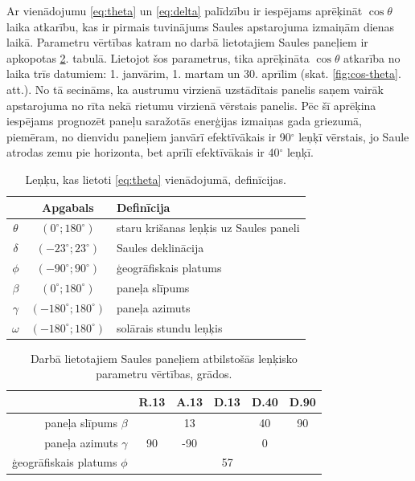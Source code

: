 Ar vienādojumu \ref{eq:theta} un \ref{eq:delta} palīdzību ir iespējams aprēķināt $\cos{\theta}$ laika atkarību, kas ir pirmais tuvinājums Saules apstarojuma izmaiņām dienas laikā.
Parametru vērtības katram no darbā lietotajiem Saules paneļiem ir apkopotas \ref{tab:param}. tabulā.
Lietojot šos parametrus, tika aprēķināta $\cos{\theta}$ atkarība no laika trīs datumiem: 1. janvārim, 1. martam un 30. aprīlim (skat. \ref{fig:cos-theta}. att.). No tā secināms, ka austrumu virzienā uzstādītais panelis saņem vairāk apstarojuma no rīta nekā rietumu virzienā vērstais panelis. Pēc šī aprēķina iespējams prognozēt paneļu saražotās enerģijas izmaiņas gada griezumā, piemēram, no dienvidu paneļiem janvārī efektīvākais ir 90$^\circ$ leņķī vērstais, jo Saule atrodas zemu pie horizonta, bet aprīlī efektīvākais ir 40$^\circ$ leņķī.

\begin{table}[h!]
\caption{Leņķu, kas lietoti \ref{eq:theta} vienādojumā, definīcijas.}
\begin{center}
\begin{tabular}{|c|c|l|}\hline
	         &         Apgabals         & Definīcija\\ \hline
	$\theta$ &  $(0^\circ;180^\circ)$   & staru krišanas leņķis uz Saules paneli\\ \hline
	$\delta$ &  $(-23^\circ;23^\circ)$  & Saules deklinācija\\ \hline
	 $\phi$  &  $(-90^\circ;90^\circ)$  & ģeogrāfiskais platums\\ \hline
	$\beta$  &  $(0^\circ;180^\circ)$   & paneļa slīpums \\ \hline
	$\gamma$ & $(-180^\circ;180^\circ)$ & paneļa azimuts \\ \hline
	$\omega$ & $(-180^\circ;180^\circ)$ & solārais stundu leņķis\\ \hline
\end{tabular}
\end{center}
\label{tab:theta}
\end{table}

\begin{table}[h!]
	\caption{Darbā lietotajiem Saules paneļiem atbilstošās leņķisko parametru vērtības, grādos.}
	\begin{center}
		\begin{tabular}{|r|c|c|c|c|c|}
			\hline
			         & R.13 & A.13 &   D.13   & D.40 & D.90 \\ \hline
			paneļa slīpums $\beta$  & \multicolumn{3}{c|}{13} &  40  &  90  \\ \hline
			paneļa azimuts $\gamma$ &  90  & -90  & \multicolumn{3}{c|}{0}  \\ \hline
			ģeogrāfiskais platums $\phi$  &        \multicolumn{5}{c|}{57}        \\ \hline
		\end{tabular}
	\end{center}
	\label{tab:param}
\end{table}

